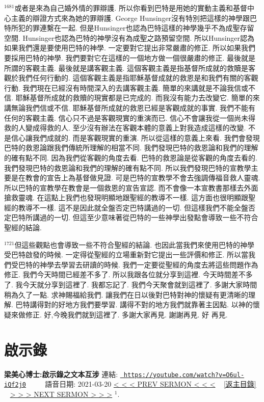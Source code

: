 \documentclass{book}
\begin{document}
$^{1681}$或者是來為自己婚外情的罪辯護.
所以你看到巴特是用她的實動主義和基督中心主義的辯證方式來為她的罪辯護.
George Hunsinger沒有特別把這樣的神學跟巴特所犯的罪連繫在一起.
但是Hunsinger也認為巴特這樣的神學幾乎不為成聖存留空間.
Hunsinger也認為巴特的神學沒有為成聖之路預留空間.
所以Hunsinger認為如果我們還是要使用巴特的神學.
一定要對它提出非常嚴肅的修正.
所以如果我們要採用巴特的神學.
我們要對它在這樣的一個地方做一個很嚴肅的修正.
最後就是所謂的客觀主義.
最後就是講客觀主義.
這個客觀主義是指基督所成就的救贖是客觀於我們任何行動的.
這個客觀主義是指耶穌基督成就的救恩是和我們有關的客觀行動.
我們現在已經沒有時間深入的去講客觀主義.
簡單的來講就是不論我信或不信.
耶穌基督所成就的救贖的現實都是已完成的.
而我沒有能力去改變它.
簡單的來講無論我們信或不信.
耶穌基督所成就的救恩已經是客觀成就的事實.
我們不能有任何的客觀主義.
信心只不過是客觀現實的重演而已.
信心不會讓我從一個尚未得救的人變成得救的人.
至少沒有辦法在客觀本體的意義上對我造成這樣的改變.
不是信心讓我們成就的.
而是客觀現實的重演.
所以從這樣的意義上來看.
我們會發現巴特的救恩論跟我們傳統所理解的相當不同.
我們發現巴特的救恩論和我們的理解的確有點不同.
因為我們從客觀的角度去看.
巴特的救恩論是從客觀的角度去看的.
我們發現巴特的救恩論和我們的理解的確有點不同.
所以我們發現巴特的宣教學主要是在教會的宣告上為基督做見證.
可是巴特的宣教學不會去強調傳福音救人靈魂.
所以巴特的宣教學在教會是一個救恩的宣告宣認.
而不會像一本宣教書那樣去外面搶救靈魂.
在這點上我們也發現明顯地跟聖經的教導不一樣.
這方面也很明顯跟聖經的教導不一樣.
這不是因此就全盤否定巴特講過的一切.
但這樣我們不能全盤否定巴特所講過的一切.
但這至少意味著從巴特的一些神學出發點會導致一些不符合聖經的結論.

$^{1721}$但這些觀點也會導致一些不符合聖經的結論.
也因此當我們來使用巴特的神學受巴特啟發的時候.
一定得從聖經的立場重新對它提出一些評價和修正.
所以當我們受巴特的神學去學習去研讀的時候.
我們一定要從聖經的角度去將這些問題作為修正.
我們今天時間已經差不多了.
所以我跟各位就分享到這裡.
今天時間差不多了.
我今天就分享到這裡了.
我都忘記了.
我們今天聚會就到這裡了.
多謝大家時間稍為久了一點.
求神賜福給我們.
讓我們在日以後對巴特對神的懷疑有更清晰的理解.
巴特講得對的好地方我們要學習.
講得不對的地方我們就靠著主因點.
以神的懷疑來做修正.
好,今晚我們就到這裡了.
多謝大家再見.
謝謝再見.
好 再見.
\newpage



\section{啟示錄}
\label{sec:O6ul_iQf2j0}
\textbf{梁美心博士:啟示錄之文本互涉}
\newline
\newline
連結: \href{https://youtube.com/watch?v=O6ul-iQf2j0}{\texttt{ https://youtube.com/watch?v=O6ul-iQf2j0}} ~~~~ 語音日期: 2021-03-20 
\newline
\newline
\hyperref[sec:QJ5_Q_62J64]{\small{< < < PREV SERMON < < <}}
~
\hyperref[sec:index]{\small{[返主目錄]}}
~
\hyperref[sec:o38R7JdB1AM]{\small{> > > NEXT SERMON > > >}}
\newline
\newline
$^{1}$.
\newpage
\end{document}
